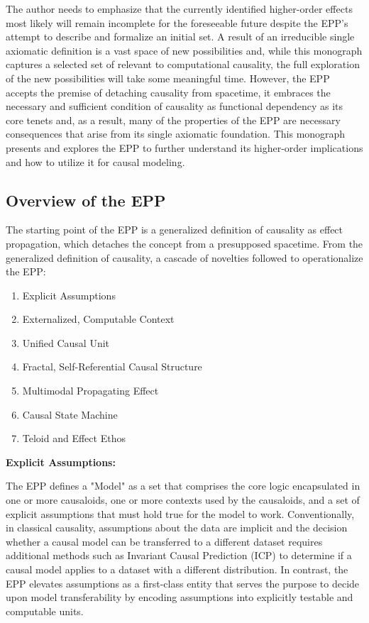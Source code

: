 The author needs to emphasize that the currently identified higher-order effects most likely will remain incomplete for the foreseeable future despite the EPP's attempt to describe and formalize an initial set. A result of an irreducible single axiomatic definition  is a vast space of new possibilities and, while this monograph captures a selected set of relevant to computational causality, the full exploration of the new possibilities will take some meaningful time. However, the EPP accepts the premise of detaching causality from spacetime, it embraces the necessary and sufficient condition of causality as functional dependency as its core tenets and, as a result, many of the properties of the EPP are necessary consequences that arise from its single axiomatic foundation. This monograph presents and explores the EPP to further understand its higher-order implications and how to utilize it for causal modeling. 
% 
%
\subsection{Overview of the EPP}
\label{sec:epp_overview}

The starting point of the EPP is a generalized definition of causality as effect propagation, which detaches the concept from a presupposed spacetime. From the generalized definition of causality, a cascade of novelties followed to operationalize the EPP:

\begin{enumerate}
	\item Explicit Assumptions 
	\item Externalized, Computable Context
	\item Unified Causal Unit
	\item Fractal, Self-Referential Causal Structure
	\item Multimodal Propagating Effect
	\item Causal State Machine 
	\item Teloid and Effect Ethos
\end{enumerate}


\textbf{Explicit Assumptions:}

The EPP defines a "Model" as a set that comprises the core logic encapsulated in one or more causaloids, one or more contexts used by the causaloids, and a set of explicit assumptions that must hold true for the model to work. Conventionally, in classical causality, assumptions about the data are  implicit and the decision whether a causal model can be transferred to a different dataset requires additional methods such as Invariant Causal Prediction (ICP) to determine if a causal model applies to a dataset with a different distribution. In contrast, the EPP elevates assumptions as a first-class entity that serves the purpose to decide upon model transferability by encoding assumptions into explicitly testable and computable units. 

